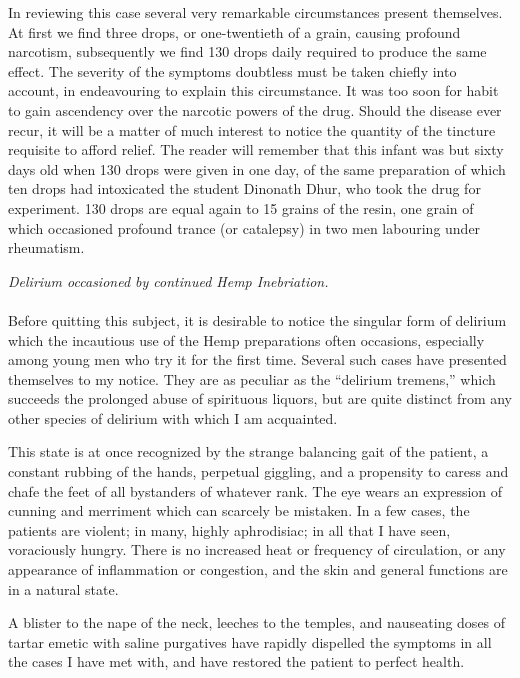 \documentclass[a4paper, 11pt, oneside, polutonikogreek, english]{article}
\begin{document}
In reviewing this case several very remarkable circumstances present themselves. At first we find three drops, or one-twentieth of a grain, causing profound narcotism, subsequently we find 130 drops daily required to produce the same effect. The severity of the symptoms doubtless must be taken chiefly into account, in endeavouring to explain this circumstance. It was too soon for habit to gain ascendency over the narcotic powers of the drug. Should the disease ever recur, it will be a matter of much interest to notice the quantity of the tincture requisite to afford relief. The reader will remember that this infant was but sixty days old when 130 drops were given in one day, of the same preparation of which ten drops had intoxicated the student Dinonath Dhur, who took the drug for experiment. 130 drops are equal again to 15 grains of the resin, one grain of which occasioned profound trance (or catalepsy) in two men labouring under rheumatism.
\begin{center}
\emph{Delirium occasioned by continued Hemp Inebriation.}
\end{center}
\paragraph{}
Before quitting this subject, it is desirable to notice the singular form of delirium which the incautious use of the Hemp preparations often occasions, especially among young men who try it for the first time. Several such cases have presented themselves to my notice. They are as peculiar as the ``delirium tremens,'' which succeeds the prolonged abuse of spirituous liquors, but are quite distinct from any other species of delirium with which I am acquainted.

This state is at once recognized by the strange balancing gait of the patient, a constant rubbing of the hands, perpetual giggling, and a propensity to caress and chafe the feet of all bystanders of whatever rank. The eye wears an expression of cunning and merriment which can scarcely be mistaken. In a few cases, the patients are violent; in many, highly aphrodisiac; in all that I have seen, voraciously hungry. There is no increased heat or frequency of circulation, or any appearance of inflammation or congestion, and the skin and general functions are in a natural state.

A blister to the nape of the neck, leeches to the temples, and nauseating doses of tartar emetic with saline purgatives have rapidly dispelled the symptoms in all the cases I have met with, and have restored the patient to perfect health.
\end{document}
